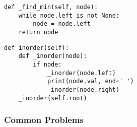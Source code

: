 \begin{algo}
\begin{lstlisting}
def _find_min(self, node):
    while node.left is not None:
        node = node.left
    return node
\end{lstlisting}
\end{algo}

\begin{algo}
\begin{lstlisting}
def inorder(self):
    def _inorder(node):
        if node:
            _inorder(node.left)
            print(node.val, end=' ')
            _inorder(node.right)
    _inorder(self.root)
\end{lstlisting}
\end{algo}    
\newpage

\subsubsection{Common Problems}
